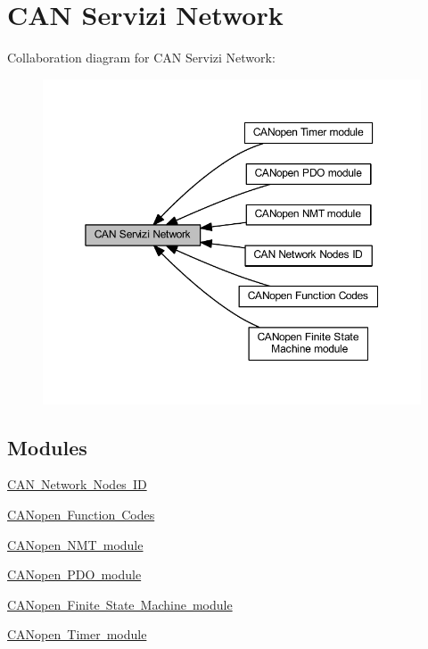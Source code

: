 \hypertarget{group___c_a_n__network__module}{}\section{C\+AN Servizi Network}
\label{group___c_a_n__network__module}
Collaboration diagram for C\+AN Servizi Network\+:\nopagebreak
\begin{figure}[H]
\begin{center}
\leavevmode
\includegraphics[width=350pt]{group___c_a_n__network__module}
\end{center}
\end{figure}
\subsection*{Modules}
\begin{DoxyCompactItemize}
\item 
\mbox{\hyperlink{group___c_a_n___i_d}{C\+A\+N Network Nodes ID}}
\item 
\mbox{\hyperlink{group___c_a_nopen___func___codes}{C\+A\+Nopen Function Codes}}
\item 
\mbox{\hyperlink{group___c_a_nopen___n_m_t__group}{C\+A\+Nopen N\+M\+T module}}
\item 
\mbox{\hyperlink{group___c_a_nopen___p_d_o__module}{C\+A\+Nopen P\+D\+O module}}
\item 
\mbox{\hyperlink{group___c_a_nopen___f_s_m__module}{C\+A\+Nopen Finite State Machine module}}
\item 
\mbox{\hyperlink{group___c_a_nopen__timer__module}{C\+A\+Nopen Timer module}}
\end{DoxyCompactItemize}

